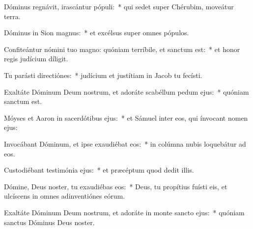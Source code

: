 \item Dóminus regnávit, irascántur pópuli:~* qui sedet super Chérubim, moveátur terra.

\item Dóminus in Sion magnus:~* et excélsus super omnes pópulos.

\item Confiteántur nómini tuo magno: quóniam terríbile, et sanctum est:~* et honor regis judícium díligit.

\item Tu parásti directiónes:~* judícium et justítiam in Jacob tu fecísti.

\item Exaltáte Dóminum Deum nostrum, et adoráte scabéllum pedum ejus:~* quóniam sanctum est.

\item Móyses et Aaron in sacerdótibus ejus:~* et Sámuel inter eos, qui ínvocant nomen ejus:

\item Invocábant Dóminum, et ipse exaudiébat eos:~* in colúmna nubis loquebátur ad eos.

\item Custodiébant testimónia ejus:~* et præcéptum quod dedit illis.

\item Dómine, Deus noster, tu exaudiébas eos:~* Deus, tu propítius fuísti eis, et ulcíscens in omnes adinventiónes eórum.

\item Exaltáte Dóminum Deum nostrum, et adoráte in monte sancto ejus:~* quóniam sanctus Dóminus Deus noster.
